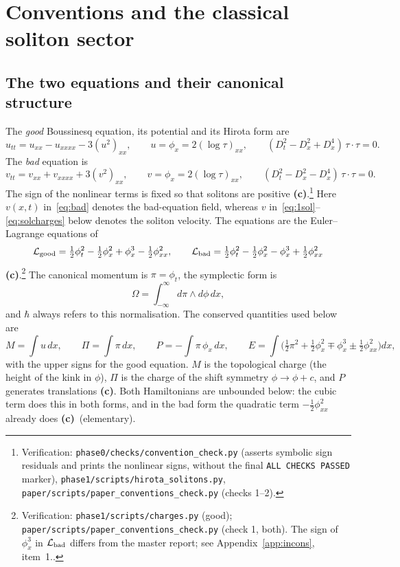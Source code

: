 \documentclass[11pt,a4paper]{article}
\newcommand{\lab}[1]{{\normalfont\sffamily\footnotesize\bfseries(#1)}}
\newcommand{\Lc}{\lab{c}}
\newcommand{\scr}[1]{\nolinkurl{#1}}
\newcommand{\chk}[1]{\footnote{\raggedright Verification: #1.}}
\newcommand{\hb}{\hbar}
\theoremstyle{remark}
\begin{document}
\section{Conventions and the classical soliton sector}\label{sec:conv}

\subsection{The two equations and their canonical structure}

The \emph{good} Boussinesq equation, its potential and its Hirota form are
\begin{equation}\label{eq:good}
u_{tt}=u_{xx}-u_{xxxx}-3(u^2)_{xx},\qquad u=\phi_x=2(\log\tau)_{xx},\qquad (D_t^2-D_x^2+D_x^4)\,\tau\cdot\tau=0 .
\end{equation}
The \emph{bad} equation is
\begin{equation}\label{eq:bad}
v_{tt}=v_{xx}+v_{xxxx}+3(v^2)_{xx},\qquad v=\phi_x=2(\log\tau)_{xx},\qquad (D_t^2-D_x^2-D_x^4)\,\tau\cdot\tau=0 .
\end{equation}
The sign of the nonlinear terms is fixed so that solitons are positive \Lc.\chk{\scr{phase0/checks/convention_check.py} (asserts symbolic sign residuals and prints the nonlinear signs, without the final \texttt{ALL CHECKS PASSED} marker), \scr{phase1/scripts/hirota_solitons.py}, \scr{paper/scripts/paper_conventions_check.py} (checks 1--2)} Here $v(x,t)$ in~\eqref{eq:bad} denotes the bad-equation field, whereas $v$ in~\eqref{eq:1sol}--\eqref{eq:solcharges} below denotes the soliton velocity. The equations are the Euler--Lagrange equations of
\begin{equation}\label{eq:Lag}
\mathcal L_{\rm good}=\tfrac12\phi_t^2-\tfrac12\phi_x^2+\phi_x^3-\tfrac12\phi_{xx}^2,\qquad
\mathcal L_{\rm bad}=\tfrac12\phi_t^2-\tfrac12\phi_x^2-\phi_x^3+\tfrac12\phi_{xx}^2
\end{equation}
\Lc.\chk{\scr{phase1/scripts/charges.py} (good); \scr{paper/scripts/paper_conventions_check.py} (check 1, both). The sign of $\phi_x^3$ in $\mathcal L_{\rm bad}$ differs from the master report; see Appendix~\ref{app:incons}, item~1.}
The canonical momentum is $\pi=\phi_t$, the symplectic form is
\begin{equation}\label{eq:Omega0}
\Omega=\int_{-\infty}^{\infty}d\pi\wedge d\phi\,dx,
\end{equation}
and $\hb$ always refers to this normalisation. The conserved quantities used below are
\begin{equation}\label{eq:charges}
M=\int u\,dx,\qquad \Pi=\int\pi\,dx,\qquad P=-\int\pi\,\phi_x\,dx,\qquad
E=\int\Big(\tfrac12\pi^2+\tfrac12\phi_x^2\mp\phi_x^3\pm\tfrac12\phi_{xx}^2\Big)dx,
\end{equation}
with the upper signs for the good equation. $M$ is the topological charge (the height of the kink in $\phi$), $\Pi$ is the charge of the shift symmetry $\phi\to\phi+c$, and $P$ generates translations \Lc. Both Hamiltonians are unbounded below: the cubic term does this in both forms, and in the bad form the quadratic term $-\tfrac12\phi_{xx}^2$ already does \Lc\ (elementary).
\end{document}
